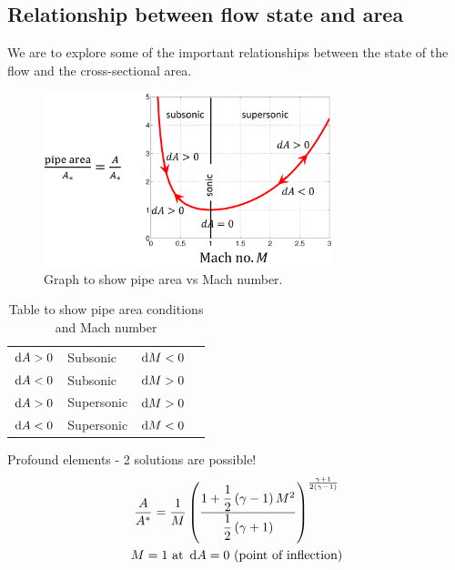 \subsection{Relationship between flow state and area}
We are to explore some of the important relationships between the state of the flow and the cross-sectional area.
\begin{figure}[H]
    \centering
    \includegraphics[width = 0.75\textwidth]{./img/diagram52.png}
    \caption{Graph to show pipe area vs Mach number.}
\end{figure}
\begin{table}[H]
    \centering
    \begin{tabular}{@{}llll@{}}
        \toprule
        $\dif A > 0$ & Subsonic   & $\dif M < 0$ & \\
        $\dif A < 0$ & Subsonic   & $\dif M > 0$ & \\
        $\dif A > 0$ & Supersonic & $\dif M > 0$ & \\
        $\dif A < 0$ & Supersonic & $\dif M < 0$ & \\ \bottomrule
    \end{tabular}
    \caption{Table to show pipe area conditions and Mach number}
\end{table}
Profound elements - 2 solutions are possible!
\begin{gather}
    \frac{A}{A^*} = \frac{1}{M}\left(\frac{1+\dfrac{1}{2}\left(\gamma - 1\right)M^2}{\dfrac{1}{2}\left(\gamma + 1\right)}\right)^{\frac{\gamma + 1}{2\left(\gamma - 1\right)}}\\
    M = 1 \textrm{ at } \dif A = 0 \textrm{ (point of inflection)}
\end{gather}
